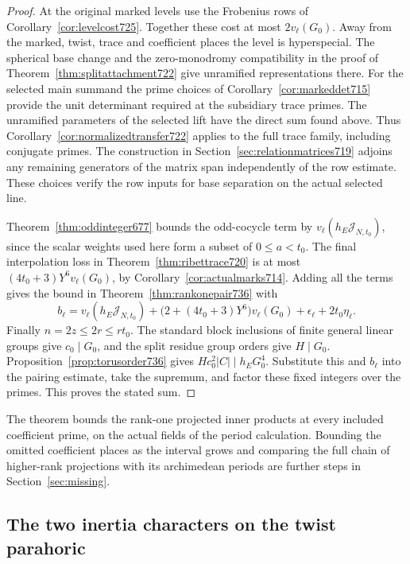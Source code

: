 \documentclass[a4paper,11pt]{article}
\theoremstyle{definition}
\theoremstyle{remark}
\numberwithin{equation}{section}
\begin{document}
\begin{proof}
At the original marked levels use the Frobenius rows of
Corollary~\ref{cor:levelcost725}. Together these cost at most
\(2v_\ell(G_0)\). Away from the marked, twist, trace and
coefficient places the level is hyperspecial. The spherical
base change and the zero-monodromy compatibility in the proof
of Theorem~\ref{thm:splitattachment722} give unramified
representations there. For the selected main summand the
prime choices of Corollary~\ref{cor:markeddet715} provide the
unit determinant required at the subsidiary trace primes.
The unramified parameters of the selected lift have the direct
sum found above. Thus Corollary~\ref{cor:normalizedtransfer722}
applies to the full trace family, including conjugate primes.
The construction in Section~\ref{sec:relationmatrices719}
adjoins any remaining generators of the matrix span independently
of the row estimate. These choices verify
the row inputs for base separation on the actual selected line.

Theorem~\ref{thm:oddinteger677} bounds the odd-cocycle term by
\(v_\ell(h_E\mathcal J_{N,t_0})\), since the scalar weights
used here form a subset of \(0\le a<t_0\). The final interpolation loss in
Theorem~\ref{thm:ribettrace720} is at most
\((4t_0+3)Y^6v_\ell(G_0)\), by Corollary~\ref{cor:actualmarks714}.
Adding all the terms gives the bound in
Theorem~\ref{thm:rankonepair736} with
\[
 b_\ell=v_\ell(h_E\mathcal J_{N,t_0})
  +\big(2+(4t_0+3)Y^6\big)v_\ell(G_0)
  +\epsilon_\ell+2t_0\eta_\ell .
\]
Finally \(n=2z\le 2r\le r t_0\). The standard block inclusions
of finite general linear groups give \(c_0\mid G_0\), and the
split residue group orders give \(H\mid G_0\).
Proposition~\ref{prop:torusorder736} gives
\(Hc_0^2|C|\mid h_E G_0^4\). Substitute this and \(b_\ell\)
into the pairing estimate, take the supremum, and factor these
fixed integers over the primes. This proves the stated sum.
\end{proof}

The theorem bounds the rank-one projected inner products at every
included coefficient prime, on the actual fields of the period
calculation. Bounding the omitted coefficient places as the interval
grows and comparing the full chain of higher-rank projections with
its archimedean periods are further steps in Section~\ref{sec:missing}.
\clearpage

\subsection{The two inertia characters on the twist parahoric}
\label{sec:twistblocks738}
\end{document}
